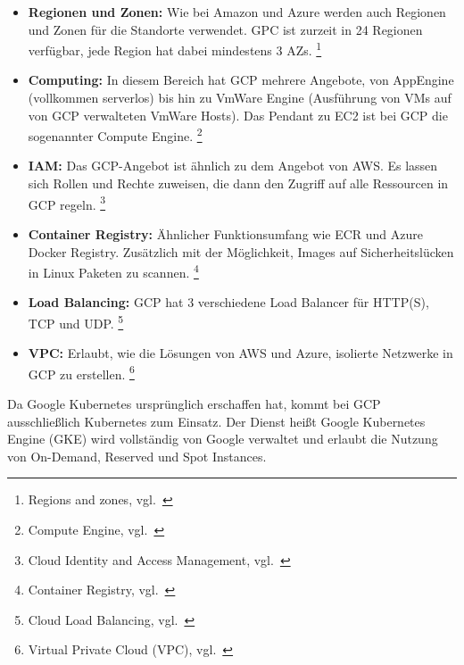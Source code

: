 \begin{itemize}
    \item \textbf{Regionen und Zonen:}
    Wie bei Amazon und Azure werden auch Regionen und Zonen für die Standorte verwendet.
    GPC ist zurzeit in 24 Regionen verfügbar, jede Region hat dabei mindestens 3 AZs.
    \footnote{{Regions and zones, vgl.~\cite{GCP_REGIONS_AND_ZONES}}}

    \item \textbf{Computing:}
    In diesem Bereich hat GCP mehrere Angebote, von AppEngine (vollkommen serverlos) bis hin zu VmWare Engine (Ausführung von VMs auf von GCP verwalteten VmWare Hosts).
    Das Pendant zu EC2 ist bei GCP die sogenannter Compute Engine.
    \footnote{{Compute Engine, vgl.~\cite{GCP_COMPUTE}}}

    \item \textbf{IAM:}
    Das GCP-Angebot ist ähnlich zu dem Angebot von AWS.
    Es lassen sich Rollen und Rechte zuweisen, die dann den Zugriff auf alle Ressourcen in GCP regeln.
    \footnote{{Cloud Identity and Access Management, vgl.~\cite{GCP_IAM}}}

    \item \textbf{Container Registry:}
    Ähnlicher Funktionsumfang wie ECR und Azure Docker Registry.
    Zusätzlich mit der Möglichkeit, Images auf Sicherheitslücken in Linux Paketen zu scannen.
    \footnote{{Container Registry, vgl.~\cite{GCP_REGISTRY}}}

    \item \textbf{Load Balancing:}
    GCP hat 3 verschiedene Load Balancer für HTTP(S), TCP und UDP.
    \footnote{{Cloud Load Balancing, vgl.~\cite{GCP_LB}}}

    \item \textbf{VPC:}
    Erlaubt, wie die Lösungen von AWS und Azure, isolierte Netzwerke in GCP zu erstellen.
    \footnote{{Virtual Private Cloud (VPC), vgl.~\cite{GCP_VPC}}}

\end{itemize}


Da Google Kubernetes ursprünglich erschaffen hat, kommt bei GCP ausschließlich Kubernetes zum Einsatz.
Der Dienst heißt Google Kubernetes Engine (GKE) wird vollständig von Google verwaltet und erlaubt die Nutzung von On-Demand, Reserved und Spot Instances.